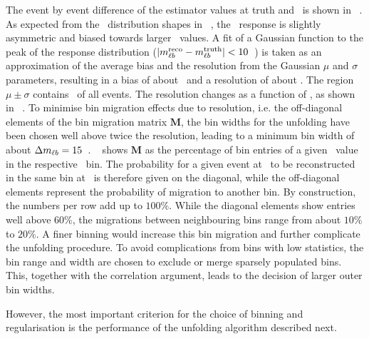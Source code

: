 The event by event difference of the estimator values at truth and \recolevel\ is shown in \fig~. As expected from the \mlb\ distribution shapes in \fig~, the \mlb\ response is slightly asymmetric and biased towards larger \mlbr\ values. A fit of a Gaussian function to the peak of the response distribution ($\vert m_{\ell b}^{\mathrm{reco}}-m_{\ell b}^{\mathrm{truth}}\vert<10$~\GeV) is taken as an approximation of the average bias and the resolution from the Gaussian $\mu$ and $\sigma$ parameters, resulting in a bias of about \averagebias\ and a resolution of about \averageres. The region $\mu\pm\sigma$ contains \eventsinpeak\ of all events. 
%
The resolution changes as a function of \mlbt, as shown in \fig~. To minimise bin migration effects due to resolution, i.e. the off-diagonal elements of the bin migration matrix $\mathbf{M}$, the bin widths for the unfolding have been chosen well above twice the resolution, leading to a minimum bin width of about $\Delta m_{\ell b}=15$~\GeV.
%
\Fig~ shows $\mathbf{M}$ as the percentage of bin entries of a given \mlbt\ value in the respective \mlbr\ bin. The probability for a given event at \truelevel\ to be reconstructed in the same bin at \recolevel\ is therefore given on the diagonal, while the off-diagonal elements represent the probability of migration to another bin. By construction, the numbers per row add up to $100\%$.
%
While the diagonal elements show entries well above $60\%$, the migrations between neighbouring bins range from about $10\%$ to $20\%$. A finer binning would increase this bin migration and further complicate the unfolding procedure.
%
To avoid complications from bins with low statistics, the bin range and width are chosen to exclude or merge sparsely populated bins. This, together with the correlation argument, leads to the decision of larger outer bin widths.


However, the most important criterion for the choice of binning and regularisation is the performance of the unfolding algorithm described next.
%


















